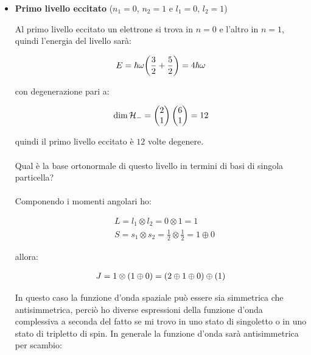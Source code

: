 \begin{itemize}
		e pertanto vale che
		
	\begin{align*}
		\Psi_0 = \psi_{\text{orb}} \otimes \psi_{\text{spin}} & = \ket{0, 0, 0} \otimes \frac{1}{\sqrt{2}} \qty( \ket{0, 0, 0, +}_1 \ket{0, 0, 0, -}_2 -  \ket{0, 0, 0, -}_1  \ket{0, 0, 0, +}_2) \\
		& = \frac{1}{\sqrt{2}} \qty( \ket{0, 0, 0, +}_1 \ket{0, 0, 0, -}_2 -  \ket{0, 0, 0, -}_1  \ket{0, 0, 0, +}_2) 
 	\end{align*}

	\item \textbf{Primo livello eccitato} ($n_1 = 0$, $n_2 = 1$ e $l_1 = 0$, $l_2 = 1$)
	
		Al primo livello eccitato un elettrone si trova in $n = 0$ e l'altro in $n = 1$, quindi l'energia del livello sarà:
		
	\begin{align*}
		E = \hbar \omega \qty(\frac{3}{2} + \frac{5}{2} ) = 4 \hbar \omega
	\end{align*}
	
		con degenerazione pari a:
		
	\begin{align*}
		\text{dim} \, \mathcal{H}_- = \mqty(2 \\ 1) \, \mqty(6 \\ 1) = 12
	\end{align*}

		quindi il primo livello eccitato è $12$ volte degenere.
		\\
		\\
		Qual è la base ortonormale di questo livello in termini di basi di singola particella?
		\\
		\\
		Componendo i momenti angolari ho:
		
	\begin{align*}
		& L = l_1 \otimes l_2 = 0 \otimes 1 = 1\\
		& S = s_1 \otimes s_2 = \frac{1}{2} \otimes \frac{1}{2} = 1 \oplus 0
	\end{align*}
	
		allora:
	
	\begin{align*}
		J = 1 \otimes \qty( 1 \oplus 0) = \qty( 2 \oplus 1 \oplus 0) \oplus \qty(1)
	\end{align*}
	
		In questo caso la funzione d'onda spaziale può essere sia simmetrica che antisimmetrica, perciò ho diverse espressioni della funzione d'onda complessiva a seconda del fatto se mi trovo in uno stato di singoletto o in uno stato di tripletto di spin. In generale la funzione d’onda sarà antisimmetrica per scambio:
	

\end{itemize}
